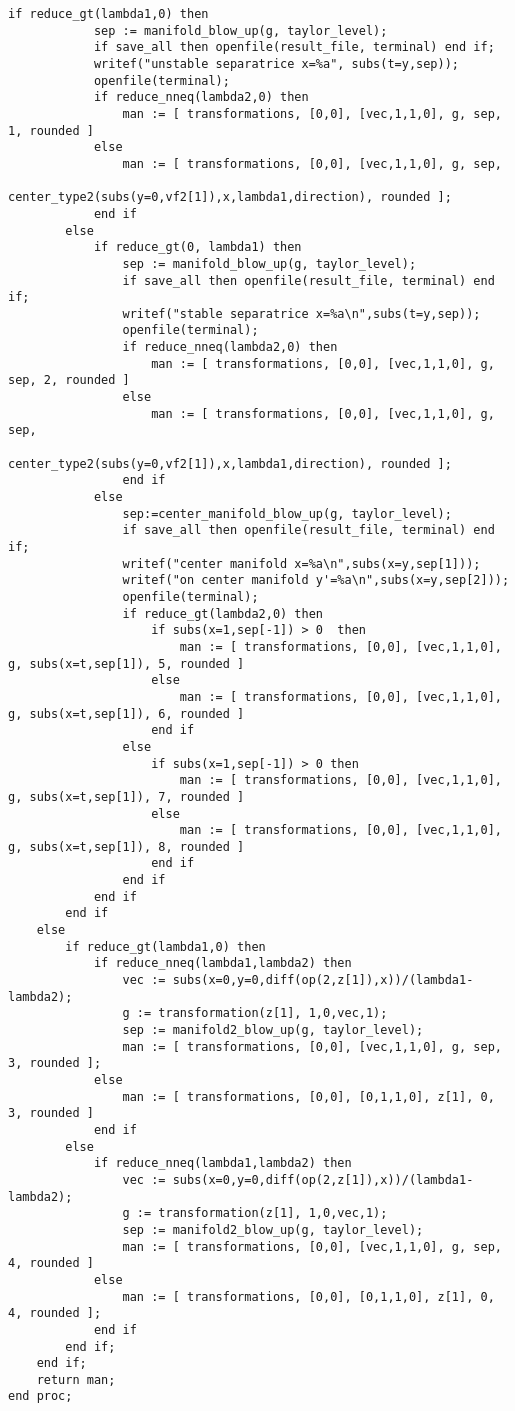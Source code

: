 \documentclass[a4paper,10pt]{article}
\begin{document}
\begin{lstlisting}[name=blowup]
        if reduce_gt(lambda1,0) then
            sep := manifold_blow_up(g, taylor_level);
            if save_all then openfile(result_file, terminal) end if;
            writef("unstable separatrice x=%a", subs(t=y,sep));
            openfile(terminal);
            if reduce_nneq(lambda2,0) then
                man := [ transformations, [0,0], [vec,1,1,0], g, sep, 1, rounded ]
            else
                man := [ transformations, [0,0], [vec,1,1,0], g, sep,
                        center_type2(subs(y=0,vf2[1]),x,lambda1,direction), rounded ];
            end if
        else
            if reduce_gt(0, lambda1) then
                sep := manifold_blow_up(g, taylor_level);
                if save_all then openfile(result_file, terminal) end if;
                writef("stable separatrice x=%a\n",subs(t=y,sep));
                openfile(terminal);
                if reduce_nneq(lambda2,0) then
                    man := [ transformations, [0,0], [vec,1,1,0], g, sep, 2, rounded ]
                else
                    man := [ transformations, [0,0], [vec,1,1,0], g, sep,
                        center_type2(subs(y=0,vf2[1]),x,lambda1,direction), rounded ];
                end if
            else
                sep:=center_manifold_blow_up(g, taylor_level);
                if save_all then openfile(result_file, terminal) end if;
                writef("center manifold x=%a\n",subs(x=y,sep[1]));
                writef("on center manifold y'=%a\n",subs(x=y,sep[2]));
                openfile(terminal);
                if reduce_gt(lambda2,0) then
                    if subs(x=1,sep[-1]) > 0  then
                        man := [ transformations, [0,0], [vec,1,1,0], g, subs(x=t,sep[1]), 5, rounded ]
                    else
                        man := [ transformations, [0,0], [vec,1,1,0], g, subs(x=t,sep[1]), 6, rounded ]
                    end if
                else
                    if subs(x=1,sep[-1]) > 0 then
                        man := [ transformations, [0,0], [vec,1,1,0], g, subs(x=t,sep[1]), 7, rounded ]
                    else
                        man := [ transformations, [0,0], [vec,1,1,0], g, subs(x=t,sep[1]), 8, rounded ]
                    end if
                end if
            end if
        end if
    else
        if reduce_gt(lambda1,0) then
            if reduce_nneq(lambda1,lambda2) then
                vec := subs(x=0,y=0,diff(op(2,z[1]),x))/(lambda1-lambda2);
                g := transformation(z[1], 1,0,vec,1);
                sep := manifold2_blow_up(g, taylor_level);
                man := [ transformations, [0,0], [vec,1,1,0], g, sep, 3, rounded ];
            else
                man := [ transformations, [0,0], [0,1,1,0], z[1], 0, 3, rounded ]
            end if
        else
            if reduce_nneq(lambda1,lambda2) then
                vec := subs(x=0,y=0,diff(op(2,z[1]),x))/(lambda1-lambda2);
                g := transformation(z[1], 1,0,vec,1);
                sep := manifold2_blow_up(g, taylor_level);
                man := [ transformations, [0,0], [vec,1,1,0], g, sep, 4, rounded ]
            else
                man := [ transformations, [0,0], [0,1,1,0], z[1], 0, 4, rounded ];
            end if
        end if;
    end if;
    return man;
end proc;


\end{lstlisting}
\end{document}
